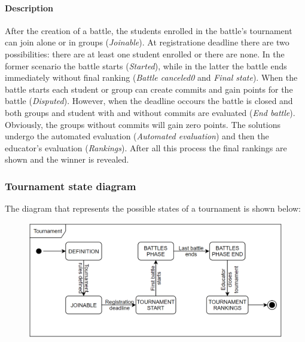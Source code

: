 \documentclass[12pt, a4paper]{report}
\begin{document}
    \paragraph*{Description}
    After the creation of a battle, the students enrolled in the battle's tournament can join alone or in groups (\textit{Joinable}). 
    At registratione deadline there are two possibilities: there are at least one student enrolled or there are none. 
    In the former scenario the battle starts (\textit{Started}), while in the latter the battle ends immediately without final ranking (\textit{Battle canceled0} and \textit{Final state}). 
    When the battle starts each student or group can create commits and gain points for the battle (\textit{Disputed}).
    However, when the deadline occours the battle is closed and both groups and student with and without commits are evaluated (\textit{End battle}). 
    Obviously, the groups without commits will gain zero points. 
    The solutions undergo the automated evaluation (\textit{Automated evaluation}) and then the educator's evaluation (\textit{Rankings}). 
    After all this process the final rankings are shown and the winner is revealed. 

    \subsubsection{Tournament state diagram}
    The diagram that represents the possible states of a tournament is shown below: 
    \begin{figure}[H]
        \centering
        \includegraphics[width=0.75\linewidth]{images/tournament.png}
    \end{figure}
\end{document}
